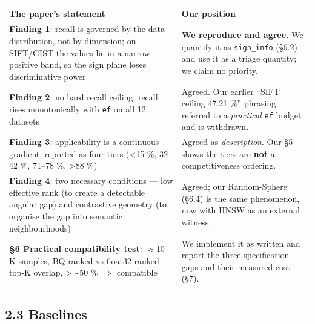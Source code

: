 \documentclass[
  10pt,
]{article}
\newcounter{none} %
\begin{document}
{\def\LTcaptype{none} %
\begin{longtable}[]{@{}
  >{\raggedright\arraybackslash}p{}
  >{\raggedright\arraybackslash}p{}@{}}
\toprule\noalign{}
\begin{minipage}[b]{\linewidth}\raggedright
The paper's statement
\end{minipage} & \begin{minipage}[b]{\linewidth}\raggedright
Our position
\end{minipage} \\
\midrule\noalign{}
\endhead
\bottomrule\noalign{}
\endlastfoot
\textbf{Finding 1}: recall is governed by the data distribution, not by
dimension; on SIFT/GIST the values lie in a narrow positive band, so the
sign plane loses discriminative power & \textbf{We reproduce and agree.}
We quantify it as \texttt{sign\_info} (§6.2) and use it as a triage
quantity; we claim no priority. \\
\textbf{Finding 2}: no hard recall ceiling; recall rises monotonically
with \texttt{ef} on all 12 datasets & Agreed. Our earlier ``SIFT ceiling
47.21 \%'' phrasing referred to a \emph{practical} \texttt{ef} budget
and is withdrawn. \\
\textbf{Finding 3}: applicability is a continuous gradient, reported as
four tiers (\textless15 \%, 32--42 \%, 71--78 \%, \textgreater88 \%) &
Agreed as \emph{description}. Our §5 shows the tiers are \textbf{not} a
competitiveness ordering. \\
\textbf{Finding 4}: two necessary conditions --- low effective rank (to
create a detectable angular gap) and contrastive geometry (to organise
the gap into semantic neighbourhoods) & Agreed; our Random-Sphere (§6.4)
is the same phenomenon, now with HNSW as an external witness. \\
\textbf{§6 Practical compatibility test}: $\approx$10 K samples, BQ-ranked vs
float32-ranked top-K overlap, \textgreater{} \textasciitilde50 \% $\Rightarrow$
compatible & We implement it as written and report the three
specification gaps and their measured cost (§7). \\
\end{longtable}
}

\subsection{2.3 Baselines}\label{baselines}
\end{document}
